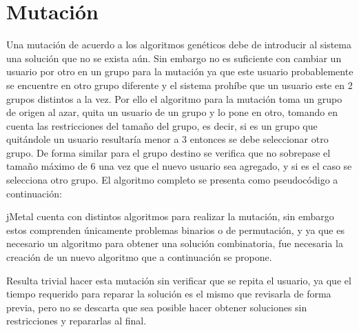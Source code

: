 \section{Mutación}

Una mutación de acuerdo a los algoritmos genéticos debe de introducir al sistema una solución que no se exista aún. Sin embargo no es suficiente con cambiar un usuario por otro en un grupo para la mutación ya que este usuario probablemente se encuentre en otro grupo diferente y el sistema prohíbe que un usuario este en 2 grupos distintos a la vez. Por ello el algoritmo para la mutación toma un grupo de origen al azar, quita un usuario de un grupo y lo pone en otro, tomando en cuenta las restricciones del tamaño del grupo, es decir, si es un grupo que quitándole un usuario resultaría menor a 3 entonces se debe seleccionar otro grupo. De forma similar para el grupo destino se verifica que no sobrepase el tamaño máximo de 6 una vez que el nuevo usuario sea agregado, y si es el caso se selecciona otro grupo. El algoritmo completo se presenta como pseudocódigo a continuación:


jMetal cuenta con distintos algoritmos para realizar la mutación, sin embargo estos comprenden únicamente problemas binarios o de permutación, y ya que es necesario un algoritmo para obtener una solución combinatoria, fue necesaria la creación de un nuevo algoritmo que a continuación se propone.

Resulta trivial hacer esta mutación sin verificar que se repita el usuario, ya que el tiempo requerido para reparar la solución es el mismo que revisarla de forma previa, pero no se descarta que sea posible hacer obtener soluciones sin restricciones y repararlas al final.

